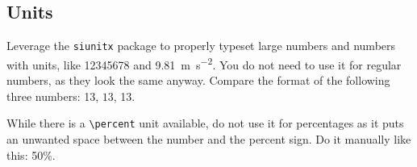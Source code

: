 \subsection{Units}

Leverage the \texttt{siunitx} package to properly typeset large numbers and numbers with units, like \num{12345678} and \SI{9.81}{\meter\per\second^2}.
You do not need to use it for regular numbers, as they look the same anyway.
Compare the format of the following three numbers: 13, $13$, \num{13}.

While there is a \texttt{\textbackslash{}percent} unit available, do not use it for percentages as it puts an unwanted space between the number and the percent sign.
Do it manually like this: 50\%.
